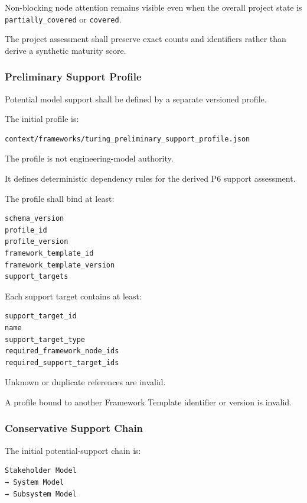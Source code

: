 Non-blocking node attention remains visible even when the overall project state is \texttt{partially\_covered} or \texttt{covered}.

The project assessment shall preserve exact counts and identifiers rather than derive a synthetic maturity score.

\hypertarget{preliminary-support-profile}{%
\subsubsection{Preliminary Support Profile}\label{preliminary-support-profile}}

Potential model support shall be defined by a separate versioned profile.

The initial profile is:

\begin{verbatim}
context/frameworks/turing_preliminary_support_profile.json
\end{verbatim}

The profile is not engineering-model authority.

It defines deterministic dependency rules for the derived P6 support assessment.

The profile shall bind at least:

\begin{verbatim}
schema_version
profile_id
profile_version
framework_template_id
framework_template_version
support_targets
\end{verbatim}

Each support target contains at least:

\begin{verbatim}
support_target_id
name
support_target_type
required_framework_node_ids
required_support_target_ids
\end{verbatim}

Unknown or duplicate references are invalid.

A profile bound to another Framework Template identifier or version is invalid.

\hypertarget{conservative-support-chain}{%
\subsubsection{Conservative Support Chain}\label{conservative-support-chain}}

The initial potential-support chain is:

\begin{verbatim}
Stakeholder Model
→ System Model
→ Subsystem Model
\end{verbatim}

